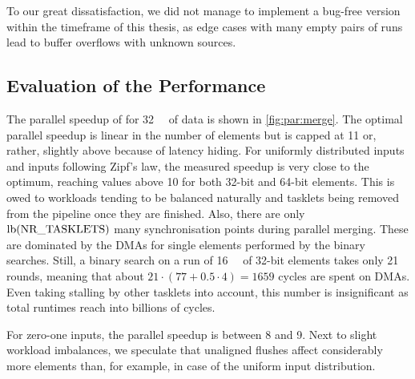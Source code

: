 To our great dissatisfaction, we did not manage to implement a bug-free version within the timeframe of this thesis, as edge cases with many empty pairs of runs lead to buffer overflows with unknown sources.



\subsection{Evaluation of the Performance}

The parallel speedup of \MS{} for \qty{32}{\mebi\byte} of data is shown in \cref{fig:par:merge}.
The optimal parallel speedup is linear in the number of elements but is capped at 11 or, rather, slightly above because of latency hiding.
For uniformly distributed inputs and inputs following Zipf's law, the measured speedup is very close to the optimum, reaching values above 10 for both 32-bit and 64-bit elements.
This is owed to workloads tending to be balanced naturally and tasklets being removed from the pipeline once they are finished.
Also, there are only \(\lb(\text{\lstinline|NR_TASKLETS|})\) many synchronisation points during parallel merging.
These are dominated by the DMAs for single elements performed by the binary searches.
Still, a binary search on a run of \qty{16}{\mebi\byte} of 32-bit elements takes only 21 rounds, meaning that about \(21 \cdot (77 + 0.5 \cdot 4) = 1659\) cycles are spent on DMAs.
Even taking stalling by other tasklets into account, this number is insignificant as total runtimes reach into billions of cycles.

For zero-one inputs, the parallel speedup is between 8 and 9.
Next to slight workload imbalances, we speculate that unaligned flushes affect considerably more elements than, for example, in case of the uniform input distribution.


